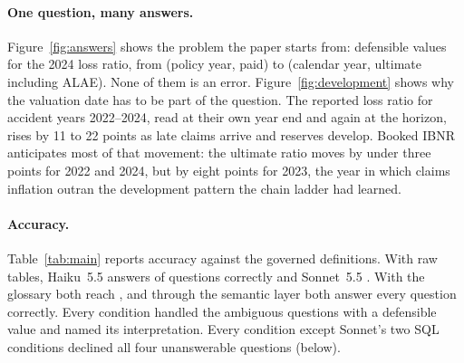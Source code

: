
\paragraph{One question, many answers.}
Figure~\ref{fig:answers} shows the problem the paper starts from: \HeadlineCount{} defensible values for the
2024 loss ratio, from \HeadlineMin{} (policy year, paid) to \HeadlineMax{} (calendar year, ultimate including
ALAE). None of them is an error. Figure~\ref{fig:development} shows why the valuation date has to be part of
the question. The reported loss ratio for accident years 2022--2024, read at their own year end and again at the horizon,
rises by 11 to 22 points as late claims arrive and reserves develop. Booked IBNR anticipates most of that
movement: the ultimate ratio moves by under three points for 2022 and 2024, but by eight points for 2023, the
year in which claims inflation outran the development pattern the chain ladder had learned.

\paragraph{Accuracy.}
Table~\ref{tab:main} reports accuracy against the governed definitions. With raw tables, Haiku~5.5 answers
\AccHaikuRaw{} of questions correctly and Sonnet~5.5 \AccSonnetRaw{}. With the glossary both reach
\AccHaikuDocs{}, and through the semantic layer both answer every question correctly. Every condition handled
the ambiguous questions with a defensible value and named its interpretation. Every condition except
Sonnet's two SQL conditions declined all four unanswerable questions (below).

